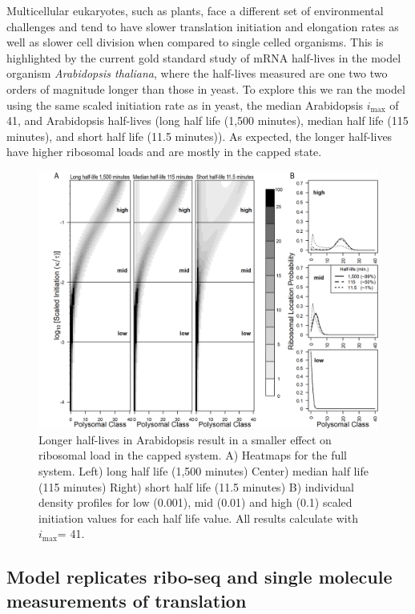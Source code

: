 \documentclass[review]{elsarticle}
\newcommand{\imax}{\ensuremath{i_{\max}}\xspace}
\begin{document}
Multicellular eukaryotes, such as plants, face a different set of environmental challenges and tend to have slower translation initiation and elongation rates as well as slower cell division when compared to single celled organisms. This is highlighted by the current gold standard study of mRNA half-lives in the model organism \textit{Arabidopsis thaliana}, where the half-lives measured are one two two orders of magnitude longer than those in yeast. To explore this we ran the model using the same scaled initiation rate as in yeast, the median Arabidopsis \imax of 41, and Arabidopsis half-lives (long half life (1,500 minutes), median half life (115 minutes), and short half life (11.5  minutes)). As expected, the longer half-lives have higher ribosomal loads and are mostly in the capped state.

\begin{figure}[!ht]
\centering
\includegraphics[width=120mm]{Images/2023-07-09_Figure2_At_Marking_Rate_range_medianlength_with_labels.png}
\caption{Longer half-lives in Arabidopsis result in a smaller effect on ribosomal load in the capped system.  A)  Heatmaps for the full system. Left) long half life (1,500 minutes) Center) median half life (115 minutes) Right) short half life (11.5  minutes)  B) individual density profiles for low (0.001), mid (0.01) and high (0.1) scaled initiation values for each half life value. All results calculate with \imax = 41.}
\end{figure}
\clearpage

\subsection{Model replicates ribo-seq and single molecule measurements of translation}
\end{document}
